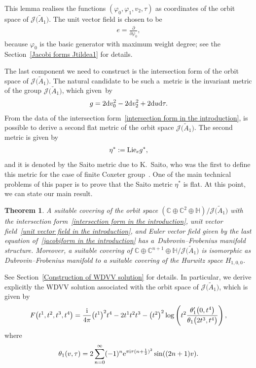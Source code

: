 \documentclass[pdftex]{sigma}%
\numberwithin{equation}{section}
\newtheorem{Theorem}{Theorem}[section]
\newcommand{\Ja}{\mathcal{J}}
\begin{document}
This lemma realises the functions $(\varphi_0,\varphi_1,v_{2},\tau)$ as coordinates of the orbit space of $\Ja\big(\tilde A_1\big)$.
The unit vector field is chosen to be
\begin{gather}\label{unit vector field in the introduction}
e=\frac{\partial}{\partial \varphi_0},
\end{gather}
because $\varphi_0$ is the basic generator with maximum weight degree; see the Section~\ref{Jacobi forms Jtildea1} for details.

The last component we need to construct is the intersection form of the orbit space of $\Ja\big(\tilde A_1\big)$. The natural candidate to be such a~metric is the invariant metric of the group $\Ja\big(\tilde A_1\big)$, which given~by
\begin{gather}\label{intersection form in the introduction}
g=2{\rm d}v_0^2-2{\rm d}v_2^2+2{\rm d}u{\rm d}\tau.
\end{gather}
From the data of the intersection form~\eqref{intersection form in the introduction}, is possible to derive a second flat metric of the orbit space $\Ja\big(\tilde A_1\big)$.
 The second metric is given by
\begin{gather*}
\eta^{*}:={\rm Lie}_{e}g^{*},
\end{gather*}
and it is denoted by the Saito metric due to K.~Saito, who was the first to define this metric for the case of finite Coxeter group~\cite{Saito}. One of the main technical problems of this paper is to prove that the Saito metric $\eta^{*}$ is flat. At this point, we can state our main result.

\begin{Theorem}
A suitable covering of the orbit space $\left(\mathbb{C}\oplus\mathbb{C}^{2}\oplus\mathbb{H}\right)/\Ja\big(\tilde A_1\big)$ with the intersection form~\eqref{intersection form in the introduction}, unit vector field~\eqref{unit vector field in the introduction}, and Euler vector field given by the last equation of~\eqref{jacobiform in the introduction} has a~Dub\-rovin--Frobenius manifold structure. Moreover, a suitable covering of $\mathbb{C}\oplus\mathbb{C}^{n+1}\oplus\mathbb{H}/\Ja\big(\tilde A_1\big)$ is isomorphic as Dubrovin--Frobenius manifold to a suitable covering of the Hurwitz space $H_{1,0,0}$.
\end{Theorem}
See Section~\ref{Construction of WDVV solution} for details. In particular, we derive explicitly the WDVV solution associated with the orbit space of $\Ja\big(\tilde A_1\big)$, which is given by
\begin{gather*}
F\big(t^1,t^2,t^3,t^4\big)=\frac{\rm i}{4\pi}\big(t^1\big)^2t^4-2t^1t^2t^3
-\big(t^2\big)^2\log\left(t^2\frac{\theta_1^{\prime}\big(0,t^4\big)}{\theta_1\big(2t^3,t^4\big)}\right),
\end{gather*}
where
\begin{gather}
\label{theta def}
\theta_1(v,\tau)=2\sum_{n=0}^{\infty} (-1)^{n}{\rm e}^{\pi {\rm i}\tau(n+\frac{1}{2})^2 }\sin((2n+1)v).
\end{gather}
\end{document}
